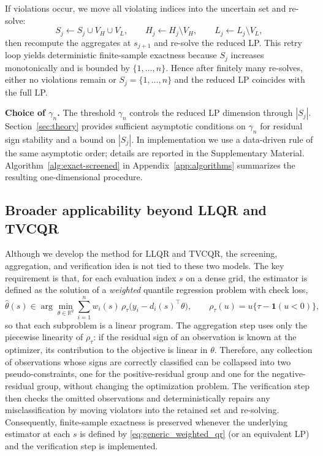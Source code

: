 \documentclass[lineno]{biometrika}
\begin{document}
If violations occur, we move all violating indices into the uncertain set and re-solve:
\[
S_j\leftarrow S_j\cup V_H\cup V_L,\qquad
H_j\leftarrow H_j\setminus V_H,\qquad
L_j\leftarrow L_j\setminus V_L,
\]
then recompute the aggregates at $s_{j+1}$ and re-solve the reduced LP. This retry loop yields deterministic finite-sample exactness
because $S_j$ increases monotonically and is bounded by $\{1,\ldots,n\}$. Hence after finitely many re-solves, either no violations
remain or $S_j=\{1,\ldots,n\}$ and the reduced LP coincides with the full LP.

\textbf{Choice of $\gamma_n$.}
The threshold $\gamma_n$ controls the reduced LP dimension through $|S_j|$.
Section~\ref{sec:theory} provides sufficient asymptotic conditions on $\gamma_n$ for residual sign stability and a
bound on $|S_j|$.
In implementation we use a data-driven rule of the same asymptotic order; details are reported in the Supplementary Material.
Algorithm~\ref{alg:exact-screened} in Appendix~\ref{app:algorithms} summarizes the resulting one-dimensional procedure.

\subsection{Broader applicability beyond LLQR and TVCQR}\label{sec:broader}

Although we develop the method for LLQR and TVCQR, the screening, aggregation, and verification idea is not tied to
these two models. The key requirement is that, for each evaluation index $s$ on a dense grid, the estimator is defined
as the solution of a \emph{weighted} quantile regression problem with check loss,
\begin{equation}
\hat\theta(s)\in\arg\min_{\theta\in\mathbb R^q}\sum_{i=1}^n w_i(s)\,\rho_\tau\!\bigl(y_i-d_i(s)^\top\theta\bigr),
\qquad \rho_\tau(u)=u\{\tau-\mathbf 1(u<0)\},
\label{eq:generic_weighted_qr}
\end{equation}
so that each subproblem is a linear program. The aggregation step uses only the piecewise linearity of $\rho_\tau$:
if the residual sign of an observation is known at the optimizer, its contribution to the objective is linear in
$\theta$. Therefore, any collection of observations whose signs are correctly classified can be collapsed into two
pseudo-constraints, one for the positive-residual group and one for the negative-residual group, without changing the
optimization problem. The verification step then checks the omitted observations and deterministically repairs any
misclassification by moving violators into the retained set and re-solving. Consequently, finite-sample exactness is
preserved whenever the underlying estimator at each $s$ is defined by \eqref{eq:generic_weighted_qr} (or an equivalent
LP) and the verification step is implemented.
\end{document}
